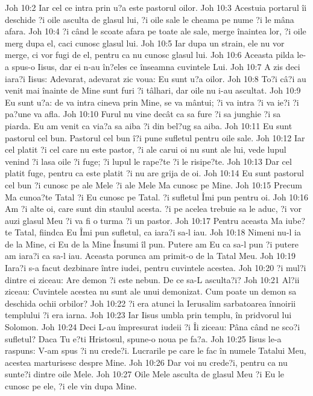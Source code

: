 Joh 10:2  Iar cel ce intra prin u?a este pastorul oilor.
Joh 10:3  Acestuia portarul îi deschide ?i oile asculta de glasul lui, ?i oile sale le cheama pe nume ?i le mâna afara.
Joh 10:4  ?i când le scoate afara pe toate ale sale, merge înaintea lor, ?i oile merg dupa el, caci cunosc glasul lui.
Joh 10:5  Iar dupa un strain, ele nu vor merge, ci vor fugi de el, pentru ca nu cunosc glasul lui.
Joh 10:6  Aceasta pilda le-a spus-o Iisus, dar ei n-au în?eles ce înseamna cuvintele Lui.
Joh 10:7  A zis deci iara?i Iisus: Adevarat, adevarat zic voua: Eu sunt u?a oilor.
Joh 10:8  To?i câ?i au venit mai înainte de Mine sunt furi ?i tâlhari, dar oile nu i-au ascultat.
Joh 10:9  Eu sunt u?a: de va intra cineva prin Mine, se va mântui; ?i va intra ?i va ie?i ?i pa?une va afla.
Joh 10:10  Furul nu vine decât ca sa fure ?i sa junghie ?i sa piarda. Eu am venit ca via?a sa aiba ?i din bel?ug sa aiba.
Joh 10:11  Eu sunt pastorul cel bun. Pastorul cel bun î?i pune sufletul pentru oile sale.
Joh 10:12  Iar cel platit ?i cel care nu este pastor, ?i ale carui oi nu sunt ale lui, vede lupul venind ?i lasa oile ?i fuge; ?i lupul le rape?te ?i le risipe?te.
Joh 10:13  Dar cel platit fuge, pentru ca este platit ?i nu are grija de oi.
Joh 10:14  Eu sunt pastorul cel bun ?i cunosc pe ale Mele ?i ale Mele Ma cunosc pe Mine.
Joh 10:15  Precum Ma cunoa?te Tatal ?i Eu cunosc pe Tatal. ?i sufletul Îmi pun pentru oi.
Joh 10:16  Am ?i alte oi, care sunt din staulul acesta. ?i pe acelea trebuie sa le aduc, ?i vor auzi glasul Meu ?i va fi o turma ?i un pastor.
Joh 10:17  Pentru aceasta Ma iube?te Tatal, fiindca Eu Îmi pun sufletul, ca iara?i sa-l iau.
Joh 10:18  Nimeni nu-l ia de la Mine, ci Eu de la Mine Însumi îl pun. Putere am Eu ca sa-l pun ?i putere am iara?i ca sa-l iau. Aceasta porunca am primit-o de la Tatal Meu.
Joh 10:19  Iara?i s-a facut dezbinare între iudei, pentru cuvintele acestea.
Joh 10:20  ?i mul?i dintre ei ziceau: Are demon ?i este nebun. De ce sa-L asculta?i?
Joh 10:21  Al?ii ziceau: Cuvintele acestea nu sunt ale unui demonizat. Cum poate un demon sa deschida ochii orbilor?
Joh 10:22  ?i era atunci la Ierusalim sarbatoarea înnoirii templului ?i era iarna.
Joh 10:23  Iar Iisus umbla prin templu, în pridvorul lui Solomon.
Joh 10:24  Deci L-au împresurat iudeii ?i Îi ziceau: Pâna când ne sco?i sufletul? Daca Tu e?ti Hristosul, spune-o noua pe fa?a.
Joh 10:25  Iisus le-a raspuns: V-am spus ?i nu crede?i. Lucrarile pe care le fac în numele Tatalui Meu, acestea marturisesc despre Mine.
Joh 10:26  Dar voi nu crede?i, pentru ca nu sunte?i dintre oile Mele.
Joh 10:27  Oile Mele asculta de glasul Meu ?i Eu le cunosc pe ele, ?i ele vin dupa Mine.
